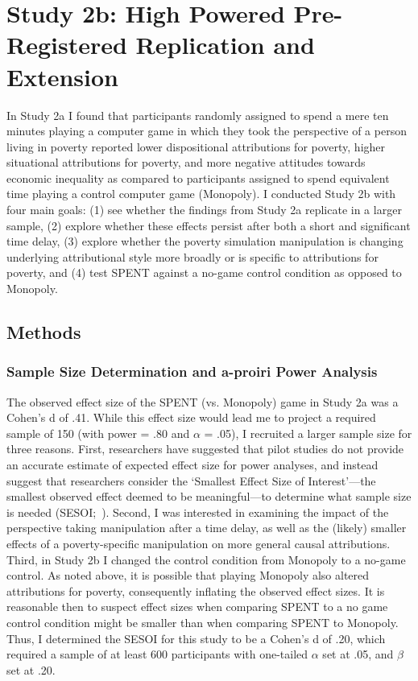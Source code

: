 \documentclass{sfuthesis}
\begin{document}
\section{Study 2b: High Powered Pre-Registered Replication and Extension}

In Study 2a I found that participants randomly assigned to spend a mere ten minutes playing a computer game in which they took the perspective of a person living in poverty reported lower dispositional attributions for poverty, higher situational attributions for poverty, and more negative attitudes towards economic inequality as compared to participants assigned to spend equivalent time playing a control computer game (Monopoly). I conducted Study 2b with four main goals: (1) see whether the findings from Study 2a replicate in a larger sample, (2) explore whether these effects persist after both a short and significant time delay, (3) explore whether the poverty simulation manipulation is changing underlying attributional style more broadly or is specific to attributions for poverty, and (4) test SPENT against a no-game control condition as opposed to Monopoly. 

\subsection{Methods}
\subsubsection{Sample Size Determination and a-proiri Power Analysis}

The observed effect size of the SPENT (vs. Monopoly) game in Study 2a was a Cohen’s d of .41. While this effect size would lead me to project a required sample of 150 (with power = .80 and $\alpha$ = .05), I recruited a larger sample size for three reasons. First, researchers have suggested that pilot studies do not provide an accurate estimate of expected effect size for power analyses, and instead suggest that researchers consider the ‘Smallest Effect Size of Interest’—the smallest observed effect deemed to be meaningful—to determine what sample size is needed (SESOI;~\cite{lakens14}). Second, I was interested in examining the impact of the perspective taking manipulation after a time delay, as well as the (likely) smaller effects of a poverty-specific manipulation on more general causal attributions. Third, in Study 2b I changed the control condition from Monopoly to a no-game control. As noted above, it is possible that playing Monopoly also altered attributions for poverty, consequently inflating the observed effect sizes. It is reasonable then to suspect effect sizes when comparing SPENT to a no game control condition might be smaller than when comparing SPENT to Monopoly. Thus, I determined the SESOI for this study to be a Cohen’s d of .20, which required a sample of at least 600 participants with one-tailed $\alpha$ set at .05, and $\beta$ set at .20. 
\end{document}
